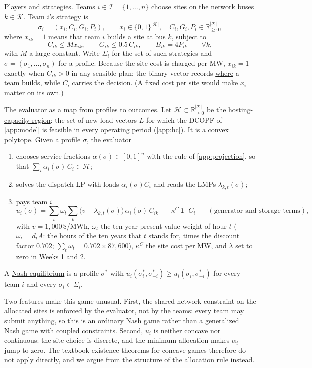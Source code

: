 \documentclass[10pt]{article}
\newcommand{\alert}[1]{{\color{alertblue}\uline{#1}}}
\begin{document}
\alert{Players and strategies.} Teams $i \in \mathcal I = \{1,\dots,n\}$
choose sites on the network buses $k \in \mathcal K$. Team $i$'s strategy is
\[
  \sigma_i = (x_i, C_i, G_i, P_i), \qquad
  x_i \in \{0,1\}^{|\mathcal K|},\quad C_i, G_i, P_i \in \mathbb R_{\ge 0}^{|\mathcal K|},
\]
where $x_{ik} = 1$ means that team $i$ builds a site at bus $k$, subject to
\[
  C_{ik} \le M x_{ik},\qquad G_{ik} \le 0.5\,C_{ik},\qquad B_{ik} = 4P_{ik}
  \qquad \forall k,
\]
with $M$ a large constant. Write $\Sigma_i$ for the set of such strategies and
$\sigma = (\sigma_1,\dots,\sigma_n)$ for a profile. Because the site cost is
charged per MW, $x_{ik} = 1$ exactly when $C_{ik} > 0$ in any sensible plan:
the binary vector records \alert{where} a team builds, while $C_i$ carries the
decision. (A fixed cost per site would make $x_i$ matter on its own.)

\alert{The evaluator as a map from profiles to outcomes.} Let
$\mathcal H \subset \mathbb R_{\ge 0}^{|\mathcal K|}$ be the
\alert{hosting-capacity region}: the set of new-load vectors $L$ for which the
DCOPF of \cref{app:model} is feasible in every operating period
(\cref{app:hc}). It is a convex polytope. Given a profile $\sigma$, the
evaluator
\begin{enumerate}[leftmargin=*]
  \item chooses service fractions $\alpha(\sigma) \in [0,1]^n$ with the rule of
    \cref{app:projection}, so that $\sum_i \alpha_i(\sigma)\, C_i \in \mathcal H$;
  \item solves the dispatch LP with loads $\alpha_i(\sigma) C_i$ and reads the
    LMPs $\lambda_{k,t}(\sigma)$;
  \item pays team $i$
  \[
    u_i(\sigma) = \sum_t \omega_t \sum_k \big(v - \lambda_{k,t}(\sigma)\big)\,
    \alpha_i(\sigma)\, C_{ik} \;-\; \kappa^{C}\, \mathbf 1^{\top} C_i
    \;-\; (\text{generator and storage terms}),
  \]
  with $v = 1{,}000$\,\$/MWh, $\omega_t$ the ten-year present-value weight of
  hour $t$ ($\omega_t = d_t A$: the hours of the ten years that $t$ stands for, times the discount factor $0.702$; $\sum_t \omega_t = 0.702 \times 87{,}600$), $\kappa^C$ the site cost
  per MW, and $\lambda$ set to zero in Weeks 1 and 2.
\end{enumerate}
A \alert{Nash equilibrium} is a profile $\sigma^*$ with
$u_i(\sigma_i^*, \sigma_{-i}^*) \ge u_i(\sigma_i, \sigma_{-i}^*)$ for every team
$i$ and every $\sigma_i \in \Sigma_i$.

Two features make this game unusual. First, the shared network constraint
on the allocated sites is enforced by the \alert{evaluator}, not by
the teams: every team may submit anything, so this is an ordinary Nash game
rather than a generalized Nash game with coupled constraints. Second, $u_i$ is
neither concave nor continuous: the site choice is discrete, and the minimum
allocation makes $\alpha_i$ jump to zero. The textbook existence theorems for
concave games therefore do not apply directly, and we argue from the structure
of the allocation rule instead.
\end{document}
